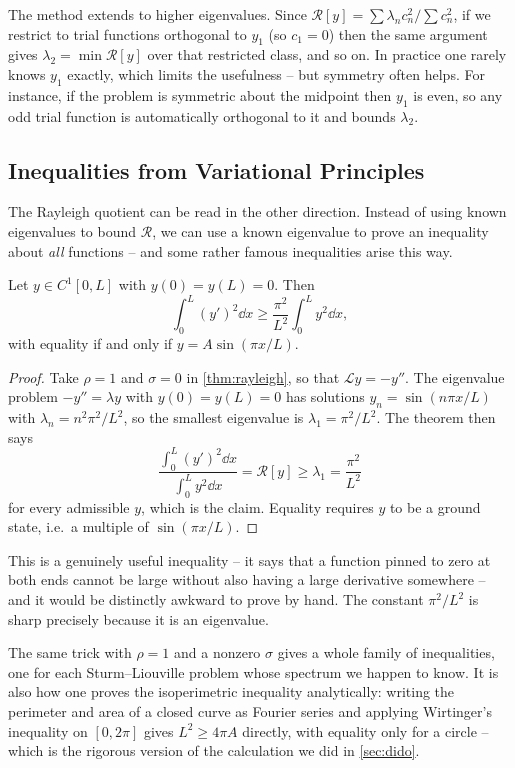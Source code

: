 \documentclass[a4paper]{scrartcl}
\begin{document}
\begin{remark}
	The method extends to higher eigenvalues. Since $\mathcal{R}[y] = \sum\lambda_n c_n^2/\sum c_n^2$, if we restrict to trial functions orthogonal to $y_1$ (so $c_1 = 0$) then the same argument gives $\lambda_2 = \min \mathcal{R}[y]$ over that restricted class, and so on. In practice one rarely knows $y_1$ exactly, which limits the usefulness -- but symmetry often helps. For instance, if the problem is symmetric about the midpoint then $y_1$ is even, so any odd trial function is automatically orthogonal to it and bounds $\lambda_2$.
\end{remark}

\subsection{Inequalities from Variational Principles}

The Rayleigh quotient can be read in the other direction. Instead of using known eigenvalues to bound $\mathcal{R}$, we can use a known eigenvalue to prove an inequality about \emph{all} functions -- and some rather famous inequalities arise this way.

\begin{theorem}
	Let $y \in C^1[0, L]$ with $y(0) = y(L) = 0$. Then
	$$
	\int_0^L (y')^2\dd x \geq \frac{\pi^2}{L^2}\int_0^L y^2 \dd x,
	$$
	with equality if and only if $y = A\sin(\pi x/L)$.
\end{theorem}
\begin{proof}
	Take $\rho = 1$ and $\sigma = 0$ in \autoref{thm:rayleigh}, so that $\mathcal{L}y = -y''$. The eigenvalue problem $-y'' = \lambda y$ with $y(0) = y(L) = 0$ has solutions $y_n = \sin(n\pi x/L)$ with $\lambda_n = n^2\pi^2/L^2$, so the smallest eigenvalue is $\lambda_1 = \pi^2/L^2$. The theorem then says
	$$
	\frac{\int_0^L (y')^2\dd x}{\int_0^L y^2\dd x} = \mathcal{R}[y] \geq \lambda_1 = \frac{\pi^2}{L^2}
	$$
	for every admissible $y$, which is the claim. Equality requires $y$ to be a ground state, i.e.\ a multiple of $\sin(\pi x/L)$.
\end{proof}

This is a genuinely useful inequality -- it says that a function pinned to zero at both ends cannot be large without also having a large derivative somewhere -- and it would be distinctly awkward to prove by hand. The constant $\pi^2/L^2$ is sharp precisely because it is an eigenvalue.

\begin{remark}
	The same trick with $\rho = 1$ and a nonzero $\sigma$ gives a whole family of inequalities, one for each Sturm--Liouville problem whose spectrum we happen to know. It is also how one proves the isoperimetric inequality analytically: writing the perimeter and area of a closed curve as Fourier series and applying Wirtinger's inequality on $[0, 2\pi]$ gives $L^2 \geq 4\pi A$ directly, with equality only for a circle -- which is the rigorous version of the calculation we did in \autoref{sec:dido}.
\end{remark}
\end{document}

